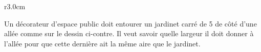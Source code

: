 
\begin{exercice}\label{exosmath-0210}

\begin{wrapfigure}{r}{3.0cm}
   \vspace{-1cm}        %
   \centering
   
\end{wrapfigure}

Un décorateur d'espace public doit entourer un jardinet carré de \unit{5}{\meter} de côté d'une allée comme sur le dessin ci-contre. Il veut savoir quelle largeur il doit donner à l'allée pour que cette dernière ait la même aire que le jardinet.


\end{exercice}
